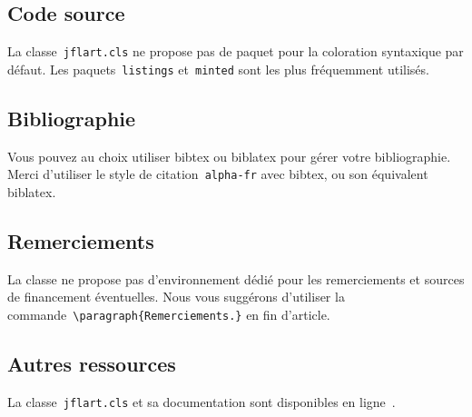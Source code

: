 \documentclass{jflart}
\newcommand{\cmd}[1]{\texttt{\textbackslash {#1}}}
\begin{document}
\subsection{Code source}

La classe~\texttt{jflart.cls} ne propose pas de paquet pour la coloration
syntaxique par défaut.
%
Les paquets~\texttt{listings} et~\texttt{minted} sont les plus fréquemment
utilisés.

\subsection{Bibliographie}

Vous pouvez au choix utiliser bibtex ou biblatex pour gérer votre bibliographie.
%
Merci d'utiliser le style de citation~\texttt{alpha-fr} avec bibtex, ou son
équivalent biblatex.

\subsection{Remerciements}

La classe ne propose pas d'environnement dédié pour les remerciements et sources de financement éventuelles.
%
Nous vous suggérons d'utiliser la commande~\cmd{paragraph\{Remerciements.\}} en
fin d'article.

\subsection{Autres ressources}

La classe~\texttt{jflart.cls} et sa documentation sont disponibles en
ligne~\cite{JFLART}.



\end{document}

